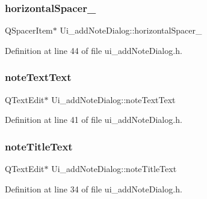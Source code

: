 \hypertarget{classUi__addNoteDialog_a2e0afdb4de479696f7488193836420bd}{}\label{classUi__addNoteDialog_a2e0afdb4de479696f7488193836420bd} 
\subsubsection{\texorpdfstring{horizontal\+Spacer\+\_}{horizontalSpacer\_6}}
{\footnotesize\ttfamily Q\+Spacer\+Item$\ast$ Ui\+\_\+add\+Note\+Dialog\+::horizontal\+Spacer\+\_}



Definition at line 44 of file ui\+\_\+add\+Note\+Dialog.\+h.

\hypertarget{classUi__addNoteDialog_a2f452da1121f801c554ea1d45b776c6b}{}\label{classUi__addNoteDialog_a2f452da1121f801c554ea1d45b776c6b} 
\subsubsection{\texorpdfstring{note\+Text\+Text}{noteTextText}}
{\footnotesize\ttfamily Q\+Text\+Edit$\ast$ Ui\+\_\+add\+Note\+Dialog\+::note\+Text\+Text}



Definition at line 41 of file ui\+\_\+add\+Note\+Dialog.\+h.

\hypertarget{classUi__addNoteDialog_ab6a4a2b756400a734bf7f4d786aa8d20}{}\label{classUi__addNoteDialog_ab6a4a2b756400a734bf7f4d786aa8d20} 
\subsubsection{\texorpdfstring{note\+Title\+Text}{noteTitleText}}
{\footnotesize\ttfamily Q\+Text\+Edit$\ast$ Ui\+\_\+add\+Note\+Dialog\+::note\+Title\+Text}



Definition at line 34 of file ui\+\_\+add\+Note\+Dialog.\+h.

\hypertarget{classUi__addNoteDialog_acf0ac47d3c4f567ca69a17769d35409d}{}\label{classUi__addNoteDialog_acf0ac47d3c4f567ca69a17769d35409d} 
